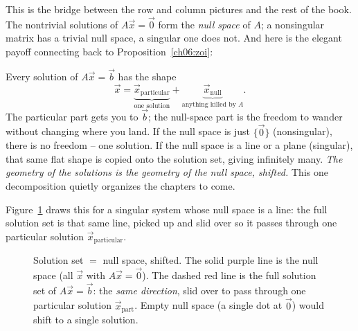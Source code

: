 This is the bridge between the row and column pictures and the rest of the
book. The nontrivial solutions of $A\vec x=\vec 0$ form the \emph{null
space} of $A$; a nonsingular matrix has a trivial null space, a singular one
does not. And here is the elegant payoff connecting back to
Proposition~\ref{ch06:zoi}:

\begin{aestheticbox}
Every solution of $A\vec x=\vec b$ has the shape
\[
  \vec x = \underbrace{\vec x_{\text{particular}}}_{\text{one solution}}
         + \underbrace{\vec x_{\text{null}}}_{\text{anything killed by }A}.
\]
The particular part gets you to $\vec b$; the null-space part is the freedom
to wander without changing where you land. If the null space is just
$\{\vec0\}$ (nonsingular), there is no freedom -- one solution. If the null
space is a line or a plane (singular), that same flat shape is copied onto
the solution set, giving infinitely many. \emph{The geometry of the
solutions is the geometry of the null space, shifted.} This one decomposition
quietly organizes the chapters to come.
\end{aestheticbox}

Figure~\ref{ch06:shift} draws this for a singular system whose null space is
a line: the full solution set is that same line, picked up and slid over so
it passes through one particular solution $\vec x_{\text{particular}}$.

\begin{figure}[H]
\centering
{}
\caption{Solution set $=$ null space, shifted. The solid purple line is the
null space (all $\vec x$ with $A\vec x=\vec0$). The dashed red line is the
full solution set of $A\vec x=\vec b$: the \emph{same direction}, slid over to
pass through one particular solution $\vec x_{\text{part}}$. Empty null space
(a single dot at $\vec 0$) would shift to a single solution.}
\label{ch06:shift}
\end{figure}

